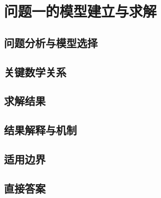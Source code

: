 \section{问题一的模型建立与求解}


\subsection{问题分析与模型选择}


\subsection{关键数学关系}


\subsection{求解结果}


\subsection{结果解释与机制}


\subsection{适用边界}


\subsection{直接答案}

